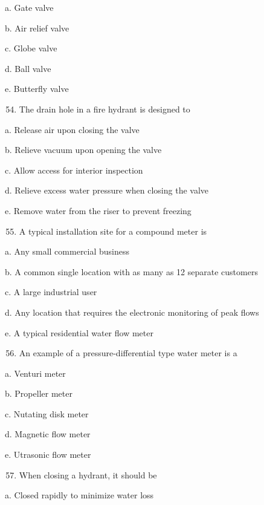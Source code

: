 \documentclass[10pt]{article}
\begin{document}
\begin{enumerate}
\begin{enumerate}
a. Gate valve

b. Air relief valve

c. Globe valve

d. Ball valve

e. Butterfly valve

\begin{enumerate}
  \setcounter{enumi}{53}
  \item The drain hole in a fire hydrant is designed to
\end{enumerate}

a. Release air upon closing the valve

b. Relieve vacuum upon opening the valve

c. Allow access for interior inspection

d. Relieve excess water pressure when closing the valve

e. Remove water from the riser to prevent freezing

\begin{enumerate}
  \setcounter{enumi}{54}
  \item A typical installation site for a compound meter is
\end{enumerate}

a. Any small commercial business

b. A common single location with as many as 12 separate customers

c. A large industrial user

d. Any location that requires the electronic monitoring of peak flows

e. A typical residential water flow meter

\begin{enumerate}
  \setcounter{enumi}{55}
  \item An example of a pressure-differential type water meter is a
\end{enumerate}

a. Venturi meter

b. Propeller meter

c. Nutating disk meter

d. Magnetic flow meter

e. Utrasonic flow meter

\begin{enumerate}
  \setcounter{enumi}{56}
  \item When closing a hydrant, it should be
\end{enumerate}

a. Closed rapidly to minimize water loss


\end{enumerate}
\end{enumerate}
\end{document}
